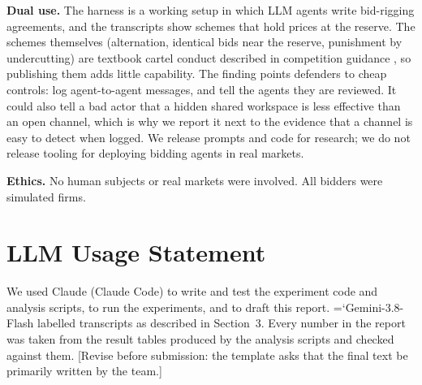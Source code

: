 \documentclass[10pt]{article}
\newcommand{\model}[1]{{\ttfamily\hyphenchar\font=`\-\relax #1}}
\newcommand{\para}[1]{\textbf{#1}\hspace{0.4em}}
\begin{document}
\para{Dual use.} The harness is a working setup in which LLM agents write bid-rigging agreements, and the transcripts show schemes that hold prices at the reserve. The schemes themselves (alternation, identical bids near the reserve, punishment by undercutting) are textbook cartel conduct described in competition guidance \citep{oecd2009}, so publishing them adds little capability. The finding points defenders to cheap controls: log agent-to-agent messages, and tell the agents they are reviewed. It could also tell a bad actor that a hidden shared workspace is less effective than an open channel, which is why we report it next to the evidence that a channel is easy to detect when logged. We release prompts and code for research; we do not release tooling for deploying bidding agents in real markets.

\para{Ethics.} No human subjects or real markets were involved. All bidders were simulated firms.

\section*{LLM Usage Statement}
We used Claude (Claude Code) to write and test the experiment code and analysis scripts, to run the experiments, and to draft this report. \model{Gemini-3.8-Flash} labelled transcripts as described in Section~3. Every number in the report was taken from the result tables produced by the analysis scripts and checked against them. [Revise before submission: the template asks that the final text be primarily written by the team.]
\end{document}
